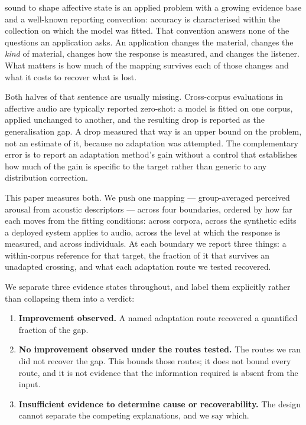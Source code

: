  sound to shape affective state is an applied problem
with a growing evidence base and a well-known reporting convention: accuracy
is characterised within the collection on which the model was fitted. That
convention answers none of the questions an application asks. An application
changes the material, changes the \emph{kind} of material, changes how the
response is measured, and changes the listener. What matters is how much of
the mapping survives each of those changes and what it costs to recover what
is lost.

Both halves of that sentence are usually missing. Cross-corpus evaluations in
affective audio are typically reported zero-shot: a model is fitted on one
corpus, applied unchanged to another, and the resulting drop is reported as
the generalisation gap. A drop measured that way is an upper bound on the
problem, not an estimate of it, because no adaptation was attempted. The
complementary error is to report an adaptation method's gain without a control
that establishes how much of the gain is specific to the target rather than
generic to any distribution correction.

This paper measures both. We push one mapping --- group-averaged perceived
arousal from acoustic descriptors --- across four boundaries, ordered by how
far each moves from the fitting conditions: across corpora, across the
synthetic edits a deployed system applies to audio, across the level at which
the response is measured, and across individuals. At each boundary we report
three things: a within-corpus reference for that target, the fraction of it
that survives an unadapted crossing, and what each adaptation route we tested
recovered.

We separate three evidence states throughout, and label them explicitly rather
than collapsing them into a verdict:

\begin{enumerate}
\item \textbf{Improvement observed.} A named adaptation route recovered a
      quantified fraction of the gap.
\item \textbf{No improvement observed under the routes tested.} The routes we
      ran did not recover the gap. This bounds those routes; it does not bound
      every route, and it is not evidence that the information required is
      absent from the input.
\item \textbf{Insufficient evidence to determine cause or recoverability.} The
      design cannot separate the competing explanations, and we say which.
\end{enumerate}

